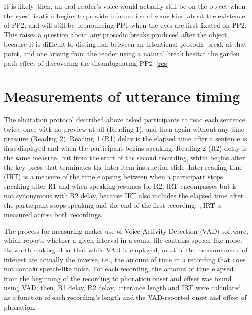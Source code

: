 \documentclass[12pt,oneside]{book}
\begin{document}
It is likely, then,  an oral reader's voice would actually still be on the object when the eyes' fixation begins to provide information of some kind about the existence of PP2, and will still be pronouncing PP1 when the eyes are first fixated on PP2. This raises a question about any prosodic breaks produced after the object, because it is difficult to distinguish between an intentional prosodic break at that point, and one arising from the reader using a natural  break  hesitat  the garden path effect of discovering the disambiguating PP2.  \ref{res} 

\hypertarget{method-irt}{%
\section{Measurements of utterance timing}\label{method-irt}}

The elicitation protocol described above asked participants to read each sentence twice, once with no preview at all (Reading 1), and then again without any time pressure (Reading 2). Reading 1 (R1) delay is the elapsed time after a sentence is first displayed and when the participant begins speaking. Reading 2 (R2) delay is the same measure, but from the start of the second recording, which begins after the key press that terminates the inter-item instruction slide. Inter-reading time (IRT) is a measure of the time elapsing between when a participant stops speaking after R1 and when speaking resumes for R2. IRT encompasses but is not synonymous with R2 delay, because IRT also includes the elapsed time after the participant stops speaking and the end of the first recording. , IRT is measured across both recordings.

The process for measuring makes use of Voice Activity Detection (VAD) software, which reports whether a given interval in a sound file contains speech-like noise. Its worth making clear that while VAD is employed, most of the measurements of interest are actually the inverse, i.e., the amount of time in a recording that does not contain speech-like noise. For each recording, the amount of time elapsed from the beginning of the recording to phonation onset and offset was found using VAD; then, R1 delay, R2 delay, utterance length and IRT were calculated as a function of each recording's length and the VAD-reported onset and offset of phonation.
\end{document}
